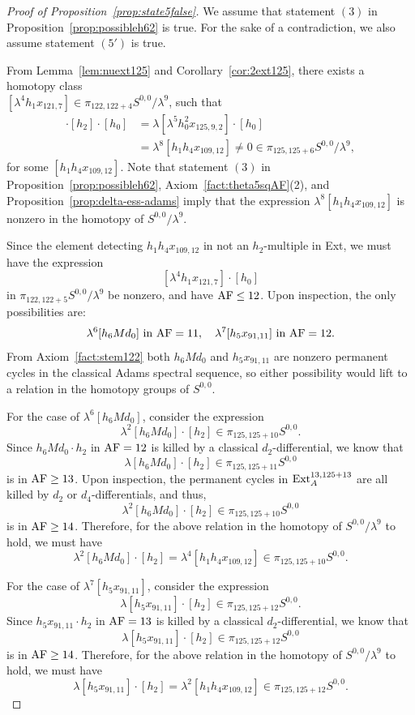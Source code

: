 \begin{proof}[Proof of Proposition~\ref{prop:state5false}]
    We assume that statement $(3)$ in Proposition~\ref{prop:possibleh62} is true. For the sake of a contradiction, we also assume statement $(5')$ is true.

    From Lemma~\ref{lem:nuext125} and Corollary~\ref{cor:2ext125}, there exists a homotopy class\\ $[\lambda^4 h_1 x_{121,7}] \in \pi_{122,122+4}S^{0,0}/\lambda^9$, such that
\begin{align*}
    [\lambda^4 h_1 x_{121,7}] \cdot [h_2] \cdot [h_0] & = \lambda [\lambda^5 h_0^2 x_{125,9,2}] \cdot [h_0] \\
    & = \lambda^8 [h_1h_4x_{109,12}] \neq 0 \in \pi_{125,125+6} S^{0,0}/\lambda^9,
\end{align*} 
    for some $[h_1h_4x_{109,12}]$. Note that statement $(3)$ in Proposition~\ref{prop:possibleh62}, Axiom~\ref{fact:theta5sqAF}(2), and Proposition~\ref{prop:delta-ess-adams} imply that the expression  $\lambda^8 [h_1h_4x_{109,12}]$ is nonzero in the homotopy of $S^{0,0}/\lambda^9$.

Since the element detecting $h_1h_4x_{109,12}$ in not an $h_2$-multiple in Ext, we must have the expression
$$[\lambda^4 h_1 x_{121,7}] \cdot [h_0]$$
in $\pi_{122,122+5} S^{0,0}/\lambda^9$ be nonzero, and have $\mathrm{AF} \le 12$. Upon inspection, the only possibilities are:
$$\lambda^6 [h_6 M d_0] \ \text{in} \ \AF=11,  \ \ \ \lambda^7 [h_5x_{91,11}] \ \text{in} \ \AF=12.$$
From Axiom~\ref{fact:stem122} both $h_6 M d_0$ and $h_5x_{91,11}$ are nonzero permanent cycles in the classical Adams spectral sequence, so either possibility would lift to a relation in the homotopy groups of $S^{0,0}$.

For the case of $\lambda^6 [h_6 M d_0]$, consider the expression
$$\lambda^2 [h_6 M d_0] \cdot [h_2] \in \pi_{125, 125+10}S^{0,0}.$$
Since $h_6 M d_0 \cdot h_2$ in $\mathrm{AF}=12$ is killed by a classical $d_2$-differential, we know that 
$$\lambda [h_6 M d_0] \cdot [h_2] \in \pi_{125, 125+11}S^{0,0}$$ 
is in $\mathrm{AF} \ge 13$. Upon inspection, the permanent cycles in $\mathrm{Ext}_A^{13, 125+13}$ are all killed by $d_2$ or $d_4$-differentials, and thus, $$\lambda^2 [h_6 M d_0] \cdot [h_2] \in \pi_{125, 125+10}S^{0,0}$$ 
is in $\mathrm{AF} \ge 14$. Therefore, for the above relation in the homotopy of $S^{0,0}/\lambda^9$ to hold, we must have 
$$\lambda^2 [h_6 M d_0] \cdot [h_2] = \lambda^4 [h_1h_4x_{109,12}] \in \pi_{125, 125+10} S^{0,0}.$$

For the case of $\lambda^7 [h_5x_{91,11}]$, consider the expression
$$\lambda [h_5x_{91,11}] \cdot [h_2] \in \pi_{125, 125+12}S^{0,0}.$$
Since $h_5x_{91,11} \cdot h_2$ in $\mathrm{AF}=13$ is killed by a classical $d_2$-differential, we know that
$$\lambda [h_5x_{91,11}] \cdot [h_2] \in \pi_{125, 125+12}S^{0,0}$$
is in $\mathrm{AF} \ge 14$.
Therefore, for the above relation in the homotopy of $S^{0,0}/\lambda^9$ to hold, we must have
$$\lambda [h_5x_{91,11}] \cdot [h_2] = \lambda^2 [h_1h_4x_{109,12}] \in \pi_{125, 125+12}S^{0,0}.$$


\end{proof}
